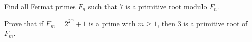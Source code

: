 \documentclass{subfile}
\begin{document}
	
	
	\begin{problem}
		Find all Fermat primes $F_n$ such that $7$ is a primitive root modulo $F_n$. %
	\end{problem}
	
	
	\begin{problem}
		Prove that if $F_{m}=2^{2^{m}}+1$ is a prime with $m\geq{1}$, then $3$ is a primitive root of $F_{m}$. %
	\end{problem}
	
	
\end{document}
